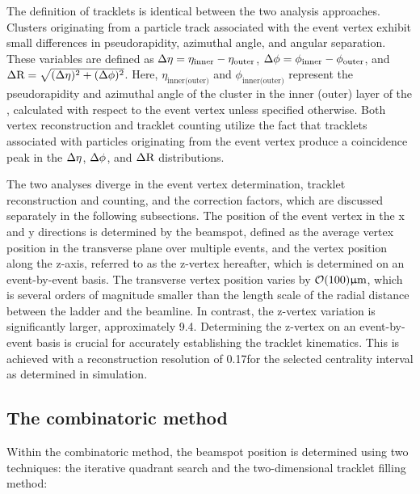 The definition of tracklets is identical between the two analysis approaches. Clusters originating from a particle track associated with the event vertex exhibit small differences in pseudorapidity, azimuthal angle, and angular separation. These variables are defined as $\Delta\eta = \eta_{\text{inner}} - \eta_{\text{outer}}$, $\Delta\phi = \phi_{\text{inner}} - \phi_{\text{outer}}$, and $\Delta \text{R}=\sqrt{(\Delta\eta)^2 + (\Delta\phi)^2}$.
Here, $\eta_{\text{inner(outer)}}$ and $\phi_{\text{inner(outer)}}$ represent the pseudorapidity and azimuthal angle of the cluster in the inner (outer) layer of the \intt, calculated with respect to the event vertex unless specified otherwise. Both vertex reconstruction and tracklet counting utilize the fact that tracklets associated with particles originating from the event vertex produce a coincidence peak in the $\Delta\eta$, $\Delta\phi$, and $\Delta \text{R}$ distributions.

The two analyses diverge in the event vertex determination, tracklet reconstruction and counting, and the correction factors, which are discussed separately in the following subsections. The position of the event vertex in the x and y directions is determined by the beamspot, defined as the average vertex position in the transverse plane over multiple events, and the vertex position along the z-axis, referred to as the z-vertex hereafter, which is determined on an event-by-event basis. The transverse vertex position varies by $\mathcal{O}(100)\upmu\mathrm{m}$, which is several orders of magnitude smaller than the length scale of the radial distance between the \intt ladder and the beamline. In contrast, the z-vertex variation is significantly larger, approximately 9.4\cm. 
Determining the z-vertex on an event-by-event basis is crucial for accurately establishing the tracklet kinematics. This is achieved with a reconstruction resolution of 0.17\cm for the selected centrality interval as determined in simulation.

\subsection{The combinatoric method}
Within the combinatoric method, the beamspot position is determined using two techniques: the iterative quadrant search and the two-dimensional tracklet filling method:  

